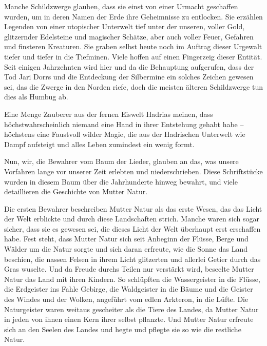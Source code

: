 \trennzeichen

Manche Schildzwerge glauben, dass sie einst von einer Urmacht geschaffen wurden, um in deren Namen der Erde ihre Geheimnisse zu entlocken. Sie erzählen Legenden von einer utopischer Unterwelt tief unter der unseren, voller Gold, glitzernder Edelsteine und magischer Schätze, aber auch voller Feuer, Gefahren und finsteren Kreaturen. Sie graben selbst heute noch im Auftrag dieser Urgewalt tiefer und tiefer in die Tiefminen. Viele hoffen auf einen Fingerzeig dieser Entität. Seit einigen Jahrzehnten wird hier und da die Behauptung aufgerufen, dass der Tod Jari Dorrs und die Entdeckung der Silbermine ein solches Zeichen gewesen sei, das die Zwerge in den Norden riefe, doch die meisten älteren Schildzwerge tun dies als Humbug ab.

\trennzeichen

Eine Menge Zauberer aus der fernen Eiswelt Hadrias meinen, dass höchstwahrscheinlich niemand eine Hand in ihrer Entstehung gehabt habe – höchstens eine Faustvoll wilder Magie, die aus der Hadrischen Unterwelt wie Dampf aufsteigt und alles Leben zumindest ein wenig formt.

\trennzeichen

Nun, wir, die Bewahrer vom Baum der Lieder, glauben an das, was unsere Vorfahren lange vor unserer Zeit erlebten und niederschrieben. Diese Schriftstücke wurden in diesem Baum über die Jahrhunderte hinweg bewahrt, und viele detaillieren die Geschichte von Mutter Natur.

Die ersten Bewahrer beschreiben Mutter Natur als das erste Wesen, das das Licht der Welt erblickte und durch diese Landschaften strich. Manche waren sich sogar sicher, dass sie es gewesen sei, die dieses Licht der Welt überhaupt erst erschaffen habe. Fest steht, dass Mutter Natur sich seit Anbeginn der Flüsse, Berge und Wälder um die Natur sorgte und sich daran erfreute, wie die Sonne das Land beschien, die nassen Felsen in ihrem Licht glitzerten und allerlei Getier durch das Gras wuselte. Und da Freude durchs Teilen nur verstärkt wird, beseelte Mutter Natur das Land mit ihren Kindern. So schlüpften die Wassergeister in die Flüsse, die Erdgeister ins Fahle Gebirge, die Waldgeister in die Bäume und die Geister des Windes und der Wolken, angeführt vom edlen Arkteron, in die Lüfte. Die Naturgeister waren weitaus gescheiter als die Tiere des Landes, da Mutter Natur in jeden von ihnen einen Kern ihrer selbst pflanzte. Und Mutter Natur erfreute sich an den Seelen des Landes und hegte und pflegte sie so wie die restliche Natur.

